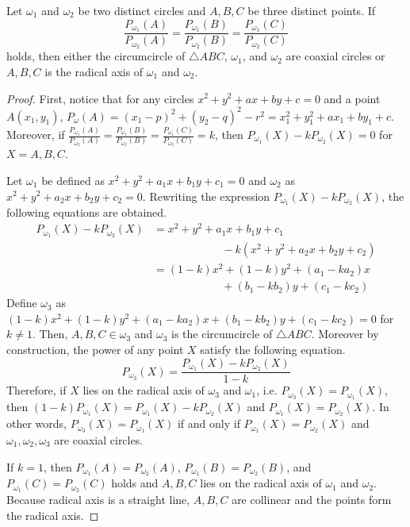 \documentclass[../../main.tex]{subfiles}
\begin{document}
\begin{theorem}{}{}
Let $\omega_1$ and $\omega_2$ be two distinct circles and $A, B, C$
be three distinct points. If
\[
\frac{P_{\omega_1}(A)}{P_{\omega_2}(A)}
= \frac{P_{\omega_1}(B)}{P_{\omega_2}(B)}
= \frac{P_{\omega_1}(C)}{P_{\omega_2}(C)}
\]
holds, then either the circumcircle of $\triangle{ABC}$, $\omega_1$,
and $\omega_2$ are coaxial circles or $A, B, C$ is the radical
axis of $\omega_1$ and $\omega_2$.
\end{theorem}
\begin{proof}
First, notice that for any circles $x^2 + y^2 + ax + by + c = 0$
and a point $A(x_1, y_1)$, $P_\omega(A) = (x_1 - p)^2 + (y_2 - q)^2
- r^2 = x_1^2 + y_1^2 + ax_1 + by_1 + c$. Moreover, if
$\frac{P_{\omega_1}(A)}{P_{\omega_2}(A)}
= \frac{P_{\omega_1}(B)}{P_{\omega_2}(B)}
= \frac{P_{\omega_1}(C)}{P_{\omega_2}(C)} = k$, then
$P_{\omega_1}(X) - k P_{\omega_2}(X) = 0$ for $X = A, B, C$.

Let $\omega_1$ be defined as $x^2 + y^2 + a_1x + b_1y + c_1 = 0$ and
$\omega_2$ as $x^2 + y^2 + a_2x + b_2y + c_2 = 0$. Rewriting the
expression $P_{\omega_1}(X) - k P_{\omega_2}(X)$, the following
equations are obtained.
\begin{align*}
    P_{\omega_1}(X) - k P_{\omega_2}(X)
    &= x^2 + y^2 + a_1x + b_1y + c_1 \\
    &\qquad\qquad\qquad\,- k(x^2 + y^2 + a_2x + b_2y + c_2) \\
    &= (1 - k) x^2 + (1 - k) y^2 + (a_1 - ka_2) x \\
    &\qquad\qquad\qquad\,+ (b_1 - kb_2) y + (c_1 - kc_2)
\end{align*}
Define $\omega_3$ as $(1 - k) x^2 + (1 - k) y^2 + (a_1 - ka_2) x +
(b_1 - kb_2) y + (c_1 - kc_2) = 0$ for $k \neq 1$. Then, $A, B, C
\in \omega_3$ and $\omega_3$ is the circumcircle of $\triangle{ABC}$.
Moreover by construction, the power of any point $X$ satisfy the
following equation.
\[
P_{\omega_3}(X)
= \frac{P_{\omega_1}(X) - k P_{\omega_2}(X)}{1 - k}
\]
Therefore, if $X$ lies on the radical axis of $\omega_3$ and
$\omega_1$, i.e. $P_{\omega_3}(X) = P_{\omega_1}(X)$, then
$(1 - k) P_{\omega_1}(X) = P_{\omega_1}(X) - k P_{\omega_2}(X)$
and $P_{\omega_1}(X) = P_{\omega_2}(X)$. In other words,
$P_{\omega_3}(X) = P_{\omega_1}(X)$ if and only if $P_{\omega_1}(X) =
P_{\omega_2}(X)$ and $\omega_1, \omega_2, \omega_3$ are coaxial
circles.

If $k = 1$, then $P_{\omega_1}(A) = P_{\omega_2}(A)$,
$P_{\omega_1}(B) = P_{\omega_2}(B)$, and $P_{\omega_1}(C) =
P_{\omega_2}(C)$ holds and $A, B, C$ lies on the radical axis of
$\omega_1$ and $\omega_2$. Because radical axis is a straight line,
$A, B, C$ are collinear and the points form the radical axis.
\end{proof}
\end{document}

